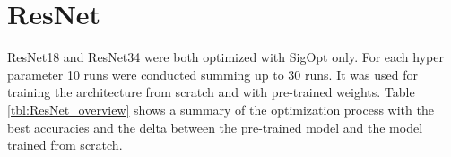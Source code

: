 \begin{figure}[H]
\label{fig:vgg13_heatmap}
\end{figure}















\section{ResNet}

ResNet18 and ResNet34 were both optimized with SigOpt only. For each hyper parameter 10 runs were conducted summing up to 30 runs. It was used for training the architecture from scratch and with pre-trained weights. Table \ref{tbl:ResNet_overview} shows a summary of the optimization process with the best accuracies and the delta between the pre-trained model and the model trained from scratch.

